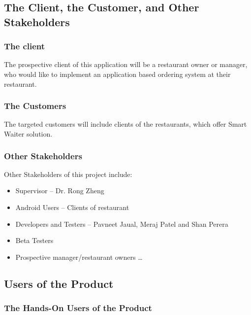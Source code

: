 \documentclass[12pt, titlepage]{article}
\begin{document}
\subsection{The Client, the Customer, and Other Stakeholders}
\subsubsection{The client}
The prospective client of this application will be a restaurant owner or manager, who would like to implement an application based ordering system at their restaurant.
\newline
\newline
\subsubsection{The Customers}
The targeted customers will include clients of the restaurants, which offer Smart Waiter solution.
\newline
\newline
\subsubsection{Other Stakeholders}
Other Stakeholders of this project include:
\begin{itemize}
  \item Supervisor – Dr. Rong Zheng
  \item 	Android Users – Clients of restaurant
  \item 	Developers and Testers – Pavneet Jaual, Meraj Patel and Shan Perera
  \item 	Beta Testers
  \item Prospective manager/restaurant owners \ldots
\end{itemize}

\subsection{Users of the Product}
\subsubsection{The Hands-On Users of the Product}
\end{document}
